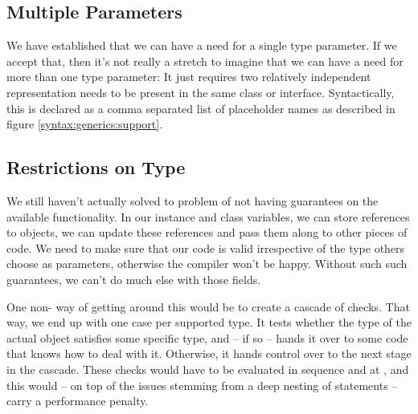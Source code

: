 \subsection{Multiple Parameters}
\label{generics:csharp:multi}

We have established that we can have a need for a single type parameter. If we accept that, then it's not really a stretch to imagine that we can have a need for more than one type parameter: It just requires two relatively independent representation needs to be present in the same class or interface. Syntactically, this is declared as a comma separated list of placeholder names as described in figure \ref{syntax:generics:support}.

\subsection{Restrictions on Type}
\label{generics:csharp:restrictions}

We still haven't actually solved to problem of not having guarantees on the available functionality. In our instance and class variables, we can store references to objects, we can update these references and pass them along to other pieces of code. We need to make sure that our code is valid irrespective of the type others choose as parameters, otherwise the compiler won't be happy. Without such such guarantees, we can't do much else with those fields.

One non- way of getting around this would be to create a cascade of  checks. That way, we end up with one  case per supported type. It tests whether the type of the actual object satisfies some specific type, and -- if so -- hands it over to some code that knows how to deal with it. Otherwise, it hands control over to the next stage in the cascade. These checks would have to be evaluated in sequence and at , and this would -- on top of the  issues stemming from a deep nesting of  statements -- carry a performance penalty.

